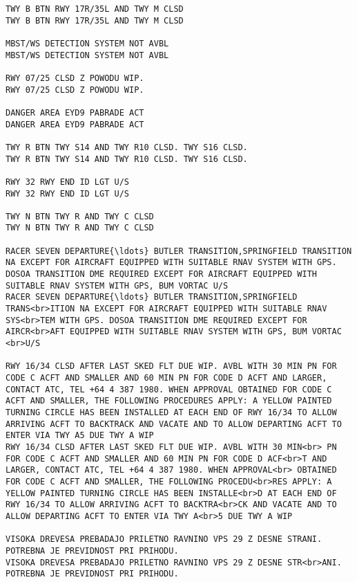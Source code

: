 \documentclass[11pt]{article}
\begin{document}
    \begin{Verbatim}[commandchars=\\\{\}]
TWY B BTN RWY 17R/35L AND TWY M CLSD
TWY B BTN RWY 17R/35L AND TWY M CLSD

MBST/WS DETECTION SYSTEM NOT AVBL
MBST/WS DETECTION SYSTEM NOT AVBL

RWY 07/25 CLSD Z POWODU WIP.
RWY 07/25 CLSD Z POWODU WIP.

DANGER AREA EYD9 PABRADE ACT
DANGER AREA EYD9 PABRADE ACT

TWY R BTN TWY S14 AND TWY R10 CLSD. TWY S16 CLSD.
TWY R BTN TWY S14 AND TWY R10 CLSD. TWY S16 CLSD.

RWY 32 RWY END ID LGT U/S
RWY 32 RWY END ID LGT U/S

TWY N BTN TWY R AND TWY C CLSD
TWY N BTN TWY R AND TWY C CLSD

RACER SEVEN DEPARTURE{\ldots} BUTLER TRANSITION,SPRINGFIELD TRANSITION NA EXCEPT FOR AIRCRAFT EQUIPPED WITH SUITABLE RNAV SYSTEM WITH GPS. DOSOA TRANSITION DME REQUIRED EXCEPT FOR AIRCRAFT EQUIPPED WITH SUITABLE RNAV SYSTEM WITH GPS, BUM VORTAC U/S
RACER SEVEN DEPARTURE{\ldots} BUTLER TRANSITION,SPRINGFIELD TRANS<br>ITION NA EXCEPT FOR AIRCRAFT EQUIPPED WITH SUITABLE RNAV SYS<br>TEM WITH GPS. DOSOA TRANSITION DME REQUIRED EXCEPT FOR AIRCR<br>AFT EQUIPPED WITH SUITABLE RNAV SYSTEM WITH GPS, BUM VORTAC <br>U/S

RWY 16/34 CLSD AFTER LAST SKED FLT DUE WIP. AVBL WITH 30 MIN PN FOR CODE C ACFT AND SMALLER AND 60 MIN PN FOR CODE D ACFT AND LARGER, CONTACT ATC, TEL +64 4 387 1980. WHEN APPROVAL OBTAINED FOR CODE C ACFT AND SMALLER, THE FOLLOWING PROCEDURES APPLY: A YELLOW PAINTED TURNING CIRCLE HAS BEEN INSTALLED AT EACH END OF RWY 16/34 TO ALLOW ARRIVING ACFT TO BACKTRACK AND VACATE AND TO ALLOW DEPARTING ACFT TO ENTER VIA TWY A5 DUE TWY A WIP
RWY 16/34 CLSD AFTER LAST SKED FLT DUE WIP. AVBL WITH 30 MIN<br> PN FOR CODE C ACFT AND SMALLER AND 60 MIN PN FOR CODE D ACF<br>T AND LARGER, CONTACT ATC, TEL +64 4 387 1980. WHEN APPROVAL<br> OBTAINED FOR CODE C ACFT AND SMALLER, THE FOLLOWING PROCEDU<br>RES APPLY: A YELLOW PAINTED TURNING CIRCLE HAS BEEN INSTALLE<br>D AT EACH END OF RWY 16/34 TO ALLOW ARRIVING ACFT TO BACKTRA<br>CK AND VACATE AND TO ALLOW DEPARTING ACFT TO ENTER VIA TWY A<br>5 DUE TWY A WIP

VISOKA DREVESA PREBADAJO PRILETNO RAVNINO VPS 29 Z DESNE STRANI. POTREBNA JE PREVIDNOST PRI PRIHODU.
VISOKA DREVESA PREBADAJO PRILETNO RAVNINO VPS 29 Z DESNE STR<br>ANI. POTREBNA JE PREVIDNOST PRI PRIHODU.


    \end{Verbatim}
\end{document}
